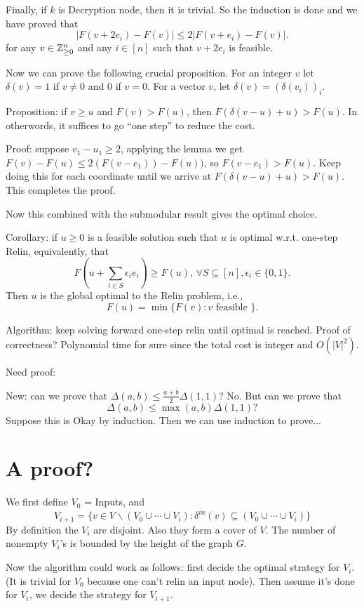 \documentclass[11pt]{article} %
\theoremstyle{plain}
\theoremstyle{definition}
\begin{document}
Finally, if $k$ is Decryption node, then it is trivial. So the induction is done and we have proved that 
$$|F(v + 2e_i) - F(v) |  \leq 2 |F(v+e_i) - F(v)|.$$ for any $v \in \mathbb{Z}_{\geq 0}^n$ and any $i \in [n]$ such that $v + 2e_i$ is feasible. 

Now we can prove the following crucial proposition. For an integer $v$ let $\delta(v) = 1$ if $v \neq 0$
and 0 if $v = 0$. For a vector $v$, let $\delta(v) = (\delta(v_i))_i$. 

Proposition: if $v \geq u$ and  $F(v)  > F(u)$, then $F( \delta(v-u) + u) > F(u)$. In otherwords, it suffices 
to go ``one step'' to reduce the cost. 

Proof: suppose $v_1 - u_1 \geq 2$,  applying the lemma we get 
$F(v) - F(u) \leq 2(F(v-e_1)) - F(u))$, so $F(v-e_1) > F(u)$. Keep doing this for each coordinate until we arrive at $F( \delta(v-u) + u) > F(u)$. This completes the proof. 


Now this combined with the submodular result gives the optimal choice. 


Corollary: if $u \geq 0$ is a feasible solution such that $u$ is optimal w.r.t. one-step Relin, equivalently, 
that 
\[
	F(u + \sum_{i \in S} \epsilon_i e_i) \geq F(u), \, \forall S \subseteq [n], \epsilon_i \in \{0, 1\}. 
\] 
Then $u$ is the global optimal to the Relin problem, i.e., 
\[
	F(u) = \min \{ F(v): v \mbox{ feasible } \}.  
\] 

Algorithm: keep solving forward one-step relin until optimal is reached. Proof of correctness? Polynomial 
time for sure since the total cost is integer and $O(|V|^2)$. 

Need proof: 

New: can we prove that $\Delta(a,b) \leq \frac{a+b}{2} \Delta(1,1)$?  No. But can we prove that 
$$\Delta(a,b) \leq \max(a,b) \Delta(1,1)?$$ Suppose this is Okay by induction. Then we can use induction
to prove...

\section{A proof?}

We first define $V_0$ = Inputs, and 
\[
	V_{i+1}   = \{ v \in V \backslash (V_0 \cup \cdots \cup V_i): \delta^{in}(v) \subseteq  (V_0 \cup \cdots \cup V_i) \}
\]
By definition the $V_i$ are disjoint. Also they form a cover of $V$. The number of nonempty $V_i$'s is 
bounded by the height of the graph $G$. 

Now the algorithm could work as follows: first decide the optimal strategy for $V_i$. (It is trivial 
for $V_0$ because one can't relin an input node). Then assume it's done for $V_i$, we decide 
the strategy for $V_{i+1}$. 
\end{document}
